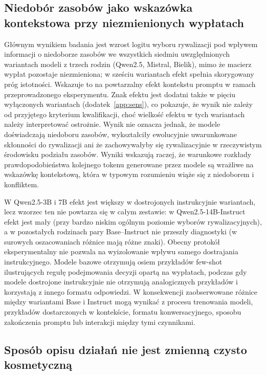 \documentclass[11pt]{article}
\begin{document}
\subsection{Niedobór zasobów jako wskazówka kontekstowa przy niezmienionych wypłatach}

Głównym wynikiem badania jest wzrost logitu wyboru rywalizacji pod wpływem informacji o niedoborze zasobów we wszystkich siedmiu uwzględnionych wariantach modeli z trzech rodzin (Qwen2.5, Mistral, Bielik), mimo że macierz wypłat pozostaje niezmieniona; w sześciu wariantach efekt spełnia skorygowany próg istotności. Wskazuje to na powtarzalny efekt kontekstu promptu w ramach przeprowadzonego eksperymentu. Znak efektu jest dodatni także w pięciu wyłączonych wariantach (dodatek~\ref{app:sens}), co pokazuje, że wynik nie zależy od przyjętego kryterium kwalifikacji, choć wielkość efektu w tych wariantach należy interpretować ostrożnie. Wynik nie oznacza jednak, że modele doświadczają niedoboru zasobów, wykształciły ewolucyjnie uwarunkowane skłonności do rywalizacji ani że zachowywałyby się rywalizacyjnie w rzeczywistym środowisku podziału zasobów. Wyniki wskazują raczej, że warunkowe rozkłady prawdopodobieństwa kolejnego tokenu generowane przez modele są wrażliwe na wskazówkę kontekstową, która w typowym rozumieniu wiąże się z niedoborem i konfliktem.

W Qwen2.5-3B i 7B efekt jest większy w dostrojonych instrukcyjnie wariantach, lecz wzorzec ten nie powtarza się w całym zestawie: w Qwen2.5-14B-Instruct efekt jest mały (przy bardzo niskim ogólnym poziomie wyborów rywalizacyjnych), a w pozostałych rodzinach pary Base--Instruct nie przeszły diagnostyki (w surowych oszacowaniach różnice mają różne znaki). Obecny protokół eksperymentalny nie pozwala na wyizolowanie wpływu samego dostrajania instrukcyjnego. Modele bazowe otrzymują osiem przykładów few-shot ilustrujących regułę podejmowania decyzji opartą na wypłatach, podczas gdy modele dostrojone instrukcyjnie nie otrzymują analogicznych przykładów i korzystają z innego formatu odpowiedzi. W konsekwencji zaobserwowane różnice między wariantami Base i Instruct mogą wynikać z procesu trenowania modeli, przykładów dostarczonych w kontekście, formatu konwersacyjnego, sposobu zakończenia promptu lub interakcji między tymi czynnikami.

\subsection{Sposób opisu działań nie jest zmienną czysto kosmetyczną}
\end{document}
